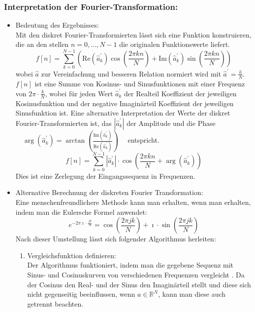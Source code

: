 \subsubsection{Interpretation der Fourier-Transformation:}
\begin{itemize}
	\item Bedeutung des Ergebnisses:\\
	Mit den diskret Fourier-Transformierten lässt sich eine Funktion konstruieren, die an den stellen \(n = 0,\dots,N-1\) die originalen Funktionswerte liefert.
	\[f[n] = \sum_{k=0}^{N-1}\left(\text{Re}(\hat{a}^\prime_k)\cos\left(\frac{2\pi kn}{N}\right)+\text{Im}(\hat{a}^\prime_k)\sin\left(\frac{2\pi kn}{N}\right)\right)\]
	wobei \(\hat{a}\) zur Vereinfachung und besseren Relation normiert wird mit \(\hat{a}^\prime = \frac{\hat{a}}{N}\).
	\(f[n]\) ist eine Summe von Kosinus- und Sinusfunktionen mit einer Frequenz von \(2\pi\cdot\frac{k}{N}\), wobei für jeden Wert \(\hat{a}^\prime_k\) der Realteil Koeffizient der jeweiligen Kosinusfunktion und der negative Imaginärteil Koeffizient der jeweiligen Sinusfunktion ist.
	Eine alternative Interpretation der Werte der diskret Fourier-Transformierten ist, das \(\left\lvert \hat{a}^\prime_k\right\rvert \) der Amplitude und die Phase \(\quad\arg(\hat{a}^\prime_k) = \arctan\left(\frac{\text{Im}(\hat{a}^\prime_k)}{\text{Re}(\hat{a}^\prime_k)}\right)\quad \) entspricht.
	\[f[n] = \sum_{k=0}^{N-1}\left\lvert\hat{a}^\prime_k\right\rvert\cdot\cos\left(\frac{2\pi kn}{N}+\arg(\hat{a}^\prime_k)\right)\]
	Dies ist eine Zerlegung der Eingangssequenz in Frequenzen.
	\item Alternative Berechnung der diskreten Fourier Transformation:\\
	Eine menschenfreundlichere Methode kann man erhalten, wenn man erhalten, indem man die Eulersche Formel anwendet:
	\[e^{-2\pi \imath \cdot\frac{jk}{N}} = \cos\left(\frac{2\pi jk}{N}\right) + \imath\cdot\sin\left(\frac{2\pi jk}{N}\right)\]
	Nach dieser Umstellung lässt sich folgender Algorithmus herleiten:
	\begin{enumerate}
		\item Vergleichsfunktion definieren:\\%
		Der Algorithmus funktioniert, indem man die gegebene Sequenz mit Sinus- und Cosinuskurven von verschiedenen Frequenzen vergleicht \cite{reducible_discrete_2023}. Da der Cosinus den Real- und der Sinus den Imaginärteil stellt und diese sich nicht gegenseitig beeinflussen, wenn \(a \in \mathbb{R}^N\), kann man diese auch getrennt beachten.

\end{enumerate}
\end{itemize}
